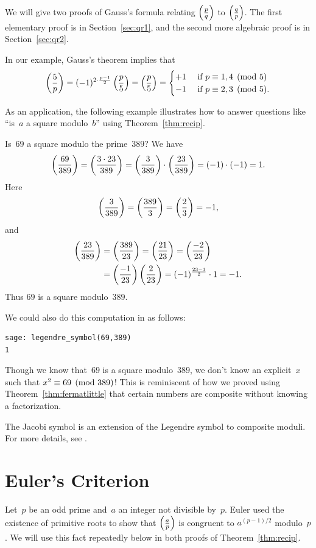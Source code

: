 We will give two proofs of Gauss's formula relating
$\left(\frac{p}{q}\right)$ to $\left(\frac{q}{p}\right)$.  The first elementary proof is in
Section~\ref{sec:qr1}, and the second more algebraic proof is in
Section~\ref{sec:qr2}.

In our example, Gauss's theorem implies that
$$
\left(\frac{5}{p}\right) = (-1)^{2\cdot \frac{p-1}{2}} \left(\frac{p}{5}\right) =\left(\frac{p}{5}\right)
= \begin{cases} +1 & \text{ if }p\equiv 1, 4\pmod{5}\\
  -1 & \text{ if }p\equiv 2, 3\pmod{5}.
\end{cases}
$$


As an application, the following example illustrates how to answer
questions like ``is~$a$ a square modulo~$b$'' using
Theorem~\ref{thm:recip}.
\begin{example}\label{ex:69}
  Is~$69$ a square
  modulo the prime~$389$?  We have
  $$\left(\frac{69}{389}\right) = \left(\frac{3\cdot 23}{389}\right) =\left(\frac{3}{389}\right)\cdot \left(\frac{23}{389}\right)
  = (-1)\cdot(-1)= 1.$$
  Here
  $$
  \left(\frac{3}{389}\right) = \left(\frac{389}{3}\right) = \left(\frac{2}{3}\right)=-1,
  $$
  and
\begin{align*}
  \left(\frac{23}{389}\right) &= \left(\frac{389}{23}\right) = \left(\frac{21}{23}\right)= \left(\frac{-2}{23}\right) \\
  &= \left(\frac{-1}{23}\right)\left(\frac{2}{23}\right) =(-1)^{\frac{23-1}{2}}\cdot 1 = -1.
\end{align*}
Thus $69$ is a square modulo~$389$.
\begin{sg}
We could also do this computation in \sage as follows:
\begin{verbatim}
sage: legendre_symbol(69,389)
1
\end{verbatim}
\end{sg}

Though we know that~$69$ is a square modulo~$389$, we don't know an
explicit~$x$ such that $x^2\equiv 69\pmod{389}$!  This is reminiscent
of how we proved using Theorem~\ref{thm:fermatlittle} that
certain numbers are composite without knowing a factorization.
\end{example}

\begin{remark}
The Jacobi symbol is an extension of the Legendre symbol
to  composite moduli.  For more details, see
.
\end{remark}

\section{Euler's Criterion}%
\label{sec:euler}
Let~$p$ be an odd prime and~$a$ an integer not divisible by~$p$.
Euler
used the existence of primitive roots to show that $\left(\frac{a}{p}\right)$
is congruent to $a^{(p-1)/2}$ modulo~$p$.  We will use this fact
repeatedly below in both proofs of Theorem~\ref{thm:recip}.

